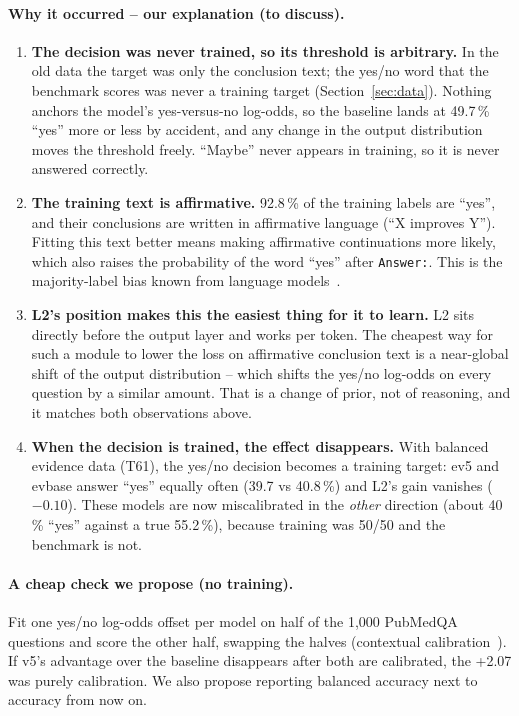 \documentclass[a4paper,11pt,parskip=half]{scrartcl}
\newcommand{\code}[1]{\texttt{\small #1}}
\begin{document}
\paragraph{Why it occurred -- our explanation (to discuss).}
\begin{enumerate}
  \item \textbf{The decision was never trained, so its threshold is arbitrary.} In the old data the target was only the conclusion text; the yes/no word that the benchmark scores was never a training target (Section~\ref{sec:data}). Nothing anchors the model's yes-versus-no log-odds, so the baseline lands at 49.7\,\% ``yes'' more or less by accident, and any change in the output distribution moves the threshold freely. ``Maybe'' never appears in training, so it is never answered correctly.
  \item \textbf{The training text is affirmative.} 92.8\,\% of the training labels are ``yes'', and their conclusions are written in affirmative language (``X improves Y''). Fitting this text better means making affirmative continuations more likely, which also raises the probability of the word ``yes'' after \code{Answer:}. This is the majority-label bias known from language models~\cite{zhao2021calibrate}.
  \item \textbf{L2's position makes this the easiest thing for it to learn.} L2 sits directly before the output layer and works per token. The cheapest way for such a module to lower the loss on affirmative conclusion text is a near-global shift of the output distribution -- which shifts the yes/no log-odds on every question by a similar amount. That is a change of prior, not of reasoning, and it matches both observations above.
  \item \textbf{When the decision is trained, the effect disappears.} With balanced evidence data (T61), the yes/no decision becomes a training target: ev5 and evbase answer ``yes'' equally often (39.7 vs 40.8\,\%) and L2's gain vanishes ($-0.10$). These models are now miscalibrated in the \emph{other} direction (about 40\,\% ``yes'' against a true 55.2\,\%), because training was 50/50 and the benchmark is not.
\end{enumerate}

\paragraph{A cheap check we propose (no training).} Fit one yes/no log-odds offset per model on half of the 1,000 PubMedQA questions and score the other half, swapping the halves (contextual calibration~\cite{zhao2021calibrate}). If v5's advantage over the baseline disappears after both are calibrated, the +2.07 was purely calibration. We also propose reporting balanced accuracy next to accuracy from now on.
\end{document}
